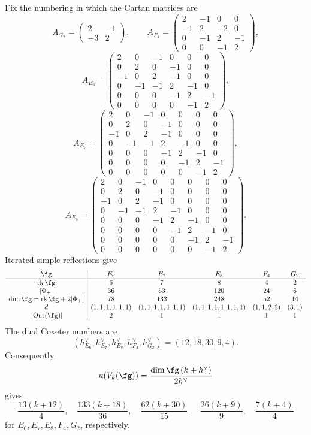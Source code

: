 \begin{corollary}
\label{cor:exceptional-yangian-graded}
Fix the numbering in which the Cartan matrices are
\[
A_{G_2}=\begin{pmatrix}2&-1\\-3&2\end{pmatrix},\qquad
A_{F_4}=\begin{pmatrix}
2&-1&0&0\\-1&2&-2&0\\0&-1&2&-1\\0&0&-1&2
\end{pmatrix},
\]
\[
A_{E_6}=\begin{pmatrix}
2&0&-1&0&0&0\\0&2&0&-1&0&0\\-1&0&2&-1&0&0\\
0&-1&-1&2&-1&0\\0&0&0&-1&2&-1\\0&0&0&0&-1&2
\end{pmatrix},
\]
\[
A_{E_7}=\begin{pmatrix}
2&0&-1&0&0&0&0\\0&2&0&-1&0&0&0\\-1&0&2&-1&0&0&0\\
0&-1&-1&2&-1&0&0\\0&0&0&-1&2&-1&0\\
0&0&0&0&-1&2&-1\\0&0&0&0&0&-1&2
\end{pmatrix},
\]
\[
A_{E_8}=\begin{pmatrix}
2&0&-1&0&0&0&0&0\\0&2&0&-1&0&0&0&0\\
-1&0&2&-1&0&0&0&0\\0&-1&-1&2&-1&0&0&0\\
0&0&0&-1&2&-1&0&0\\0&0&0&0&-1&2&-1&0\\
0&0&0&0&0&-1&2&-1\\0&0&0&0&0&0&-1&2
\end{pmatrix}.
\]
Iterated simple reflections give
\[
\begin{array}{c|ccccc}
\fg&E_6&E_7&E_8&F_4&G_2\\ \hline
\operatorname{rk}\fg&6&7&8&4&2\\
|\Phi_+|&36&63&120&24&6\\
\dim\fg=\operatorname{rk}\fg+2|\Phi_+|&78&133&248&52&14\\
d& (1,1,1,1,1,1)&(1,1,1,1,1,1,1)&(1,1,1,1,1,1,1,1)&(1,1,2,2)&(3,1)\\
|\operatorname{Out}(\fg)|&2&1&1&1&1
\end{array}
\]
The dual Coxeter numbers are
\[
(h^\vee_{E_6},h^\vee_{E_7},h^\vee_{E_8},h^\vee_{F_4},h^\vee_{G_2})
=(12,18,30,9,4).
\]
Consequently
\[
\kappa(V_k(\fg))=\frac{\dim\fg\,(k+h^\vee)}{2h^\vee}
\]
gives
\[
\frac{13(k+12)}4,\quad
\frac{133(k+18)}{36},\quad
\frac{62(k+30)}{15},\quad
\frac{26(k+9)}9,\quad
\frac{7(k+4)}4
\]
for $E_6,E_7,E_8,F_4,G_2$, respectively.
\end{corollary}


